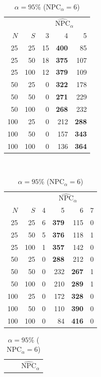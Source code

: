 \begin{table}
\begin{subtable}[h]{0.3\textwidth}
\begin{tabular}{rr|rrr}
    & & \multicolumn{3}{c}{$\widehat{\text{NPC}}_{\alpha}$} \\
    $N$ & $S$ & 3 & 4 & 5 \\
    \hline
    25 & 25 & 15 & \textbf{400} & 85\\
    25 & 50 & 18 & \textbf{375} & 107\\
    25 & 100 & 12 & \textbf{379} & 109\\
    50 & 25 & 0 & \textbf{322} & 178\\
    50 & 50 & 0 & \textbf{271} & 229\\
    50 & 100 & 0 & \textbf{268} & 232\\
    100 & 25 & 0 & 212 & \textbf{288}\\
    100 & 50 & 0 & 157 & \textbf{343}\\
    100 & 100 & 0 & 136 & \textbf{364}\\
\end{tabular}
\caption{$\alpha = 90\%$ ($\text{NPC}_{\alpha} = 5$)}
\end{subtable}
\\
\begin{subtable}[h]{0.45\textwidth}
\centering
\begin{tabular}{rr|rrrr}
    & & \multicolumn{4}{c}{$\widehat{\text{NPC}}_{\alpha}$} \\
    $N$ & $S$ & 4 & 5 & 6 & 7 \\
    \hline
    25 & 25 & 6 & \textbf{379} & 115 & 0\\
    25 & 50 & 5 & \textbf{376} & 118 & 1\\
    25 & 100 & 1 & \textbf{357} & 142 & 0\\
    50 & 25 & 0 & \textbf{288} & 212 & 0\\
    50 & 50 & 0 & 232 & \textbf{267} & 1\\
    50 & 100 & 0 & 210 & \textbf{289} & 1\\
    100 & 25 & 0 & 172 & \textbf{328} & 0\\
    100 & 50 & 0 & 110 & \textbf{390} & 0\\
    100 & 100 & 0 & 84 & \textbf{416} & 0\\
\end{tabular}
\caption{$\alpha = 95\%$ ($\text{NPC}_{\alpha} = 6$)}
\end{subtable}
\hfill
\begin{subtable}[h]{0.45\textwidth}
\centering
\begin{tabular}{rr|rrrr}
    & & \multicolumn{4}{c}{$\widehat{\text{NPC}}_{\alpha}$} \\

\end{tabular}
\end{subtable}
\end{table}
